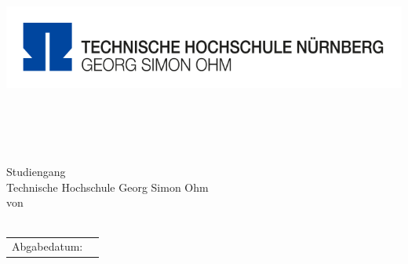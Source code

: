 \thispagestyle{plain}
\begin{titlepage}
\enlargethispage{3.5cm}
\sffamily 								%
\begin{minipage}{\textwidth}
	\vspace{-2cm}
	\noindent \includegraphics[scale=0.2]{Images/Logo_TH.png} \hfill
\end{minipage} 
\begin{center}

\huge{\textsc{\textbf{\titel}}}\\[1.5ex]
\Large{\textbf{\untertitel}}\\[5ex]
\LARGE{\textbf{\arbeit}}\\[2ex]
\normalsize{~}\\[3ex]
\Large{Studiengang \textit{\studiengang}}\\[1ex]
\normalsize{Technische Hochschule Georg Simon Ohm}\\[5ex]
von\\[1ex] \autor \\[12ex]

\begin{tabular}{ll}
	Abgabedatum:					& \quad \abgabeGI \\ 
	
	
	
\end{tabular} 

\end{center}

\end{titlepage}
\onehalfspacing